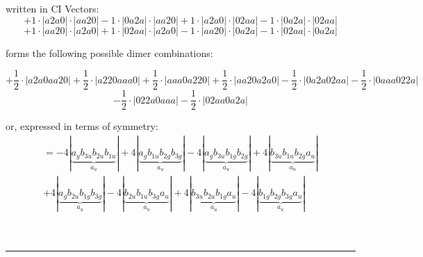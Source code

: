 \documentclass{article}
\begin{document}
\begin{minipage}{\linewidth}
written in CI Vectors: 
 $$+ 1 \cdot \left|a2a0 \right| \cdot \left| aa20 \right| 
- 1 \cdot \left|0a2a \right| \cdot \left| aa20 \right| 
+ 1 \cdot \left|a2a0 \right| \cdot \left| 02aa \right| 
- 1 \cdot \left|0a2a \right| \cdot \left| 02aa \right| 
 $$ $$ + 1 \cdot \left|aa20 \right| \cdot \left| a2a0 \right| 
+ 1 \cdot \left|02aa \right| \cdot \left| a2a0 \right| 
- 1 \cdot \left|aa20 \right| \cdot \left| 0a2a \right| 
- 1 \cdot \left|02aa \right| \cdot \left| 0a2a \right| 
$$



 forms the following possible dimer combinations:

$$+ \frac{1}{2} \cdot \left|a2a0aa20 \right| + \frac{1}{2} \cdot \left|a220aaa0 \right| + \frac{1}{2} \cdot \left|aaa0a220 \right| + \frac{1}{2} \cdot \left|aa20a2a0 \right| - \frac{1}{2} \cdot \left|0a2a02aa \right| - \frac{1}{2} \cdot \left|0aaa022a \right|  $$ $$ - \frac{1}{2} \cdot \left|022a0aaa \right| - \frac{1}{2} \cdot \left|02aa0a2a \right| $$



\end{minipage}
\vspace{0.5cm}


or, expressed in terms of symmetry:\begin{multline*}
=-4\left|\underbrace{a_{g} b_{3u} b_{2u} b_{1u}}_{a_{u}}\right|+4\left|\underbrace{a_{g} b_{1u} b_{2g} b_{3g}}_{a_{u}}\right|-4\left|\underbrace{a_{g} b_{3u} b_{1g} b_{2g}}_{a_{u}}\right|+4\left|\underbrace{b_{3u} b_{1u} b_{2g} a_{u}}_{a_{u}}\right|\\
+4\left|\underbrace{a_{g} b_{2u} b_{1g} b_{3g}}_{a_{u}}\right|-4\left|\underbrace{b_{2u} b_{1u} b_{3g} a_{u}}_{a_{u}}\right|+4\left|\underbrace{b_{3u} b_{2u} b_{1g} a_{u}}_{a_{u}}\right|-4\left|\underbrace{b_{1g} b_{2g} b_{3g} a_{u}}_{a_{u}}\right|
\end{multline*}\\\\

 


\hrule
\vspace{0.5cm}
\end{document}
